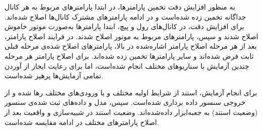 به منظور افزایش دقت تخمین پارامترها، در ابتدا پارامترهای مربوط به هر کانال جداگانه تخمین زده شده‌است و در ادامه پارامترهای مشترک کانال‌ها اصلاح شده‌اند.
 برای افزایش دقت، در کانال‌های رول و پیچ، ابتدا پارامترها به‌صورت موتور خاموش اصلاح شدند و سپس، پارامترهای مربوط به موتور اصلاح شدند.
در فرایند اصلاح پارامتر، بعد از هر مرحله اصلاح پارامتر اشاره‌شده در بالا،  پارامترهای اصلاح شده‌ی مرحله قبلی ثابت فرض شده‌اند و سایر پارامترها تخمین زده شده‌اند.
برای اصلاح پارامتر هر مرحله چندین آزمایش با سناریوهای مختلف انجام شده‌است،
اما برای رعایت ایجاز از آوردن تمامی آزمایش‌ها پرهیز شده‌است.



برای انجام آزمایش، استند از شرایط اولیه مختلف و با ورودی‌های مختلف رها شده و از خروجی سنسور داده برداری شده‌است. سپس، مدل و داده‌های ثبت شده‌ی سنسور (وضعیت استند) به جعبه‌ابزار
 داده‌شده‌اند. 
وضعیت استند در شبیه‌سازی و واقعیت بعد از اصلاح پارامترهای مختلف
در ادامه مقایسه شده‌است.











